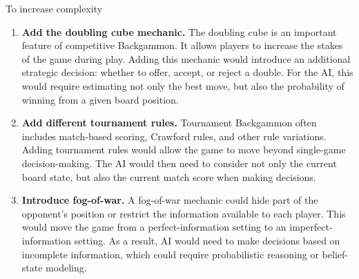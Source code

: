 \documentclass[11pt]{article}
\begin{document}
\newpage
To increase complexity
\begin{enumerate}
    \item \textbf{Add the doubling cube mechanic.}  
    The doubling cube is an important feature of competitive Backgammon. It allows players to increase the stakes of the game during play. Adding this mechanic would introduce an additional strategic decision: whether to offer, accept, or reject a double. For the AI, this would require estimating not only the best move, but also the probability of winning from a given board position.

    \item \textbf{Add different tournament rules.}  
    Tournament Backgammon often includes match-based scoring, Crawford rules, and other rule variations. Adding tournament rules would allow the game to move beyond single-game decision-making. The AI would then need to consider not only the current board state, but also the current match score when making decisions.

    \item \textbf{Introduce fog-of-war.}  
    A fog-of-war mechanic could hide part of the opponent's position or restrict the information available to each player. This would move the game from a perfect-information setting to an imperfect-information setting. As a result, AI would need to make decisions based on incomplete information, which could require probabilistic reasoning or belief-state modeling.
    
\end{enumerate}
\end{document}
